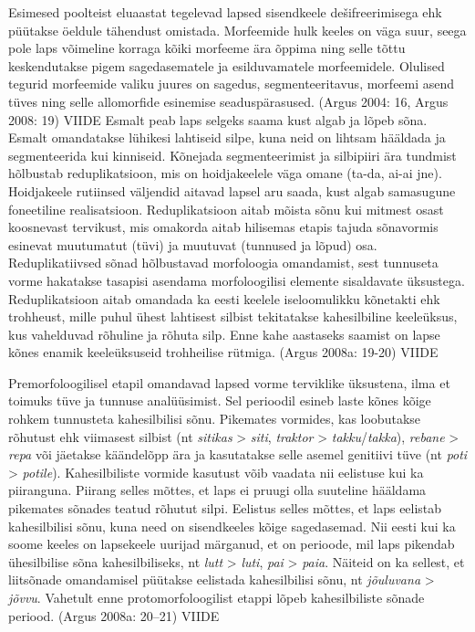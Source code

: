 \documentclass[12pt]{article}
\begin{document}
Esimesed poolteist eluaastat tegelevad lapsed sisendkeele dešifreerimisega ehk püütakse öeldule tähendust omistada. Morfeemide hulk keeles on väga suur, seega pole 
laps võimeline korraga kõiki morfeeme ära õppima ning selle tõttu keskendutakse pigem sagedasematele ja esilduvamatele morfeemidele. Olulised tegurid morfeemide valiku juures on sagedus, segmenteeritavus, morfeemi asend tüves ning selle allomorfide esinemise seaduspärasused. (Argus 2004: 16, Argus 2008: 19) VIIDE Esmalt peab laps selgeks saama kust algab ja lõpeb sõna. Esmalt omandatakse lühikesi lahtiseid silpe, kuna neid on lihtsam hääldada ja segmenteerida kui kinniseid. Kõnejada segmenteerimist ja silbipiiri ära tundmist hõlbustab reduplikatsioon, mis on hoidjakeelele väga omane (ta-da, ai-ai jne). Hoidjakeele rutiinsed väljendid aitavad lapsel aru saada, kust algab samasugune foneetiline realisatsioon. Reduplikatsioon aitab mõista sõnu kui mitmest osast koosnevast tervikust, mis omakorda aitab hilisemas etapis tajuda sõnavormis esinevat muutumatut (tüvi) ja muutuvat (tunnused ja lõpud) osa. Reduplikatiivsed sõnad hõlbustavad morfoloogia omandamist, sest tunnuseta vorme hakatakse tasapisi asendama morfoloogilisi elemente sisaldavate üksustega. Reduplikatsioon aitab omandada ka eesti keelele iseloomulikku kõnetakti ehk trohheust, mille puhul ühest lahtisest silbist tekitatakse kahesilbiline keeleüksus, kus vahelduvad rõhuline ja rõhuta silp. Enne kahe aastaseks saamist on lapse kõnes enamik keeleüksuseid trohheilise rütmiga. (Argus 2008a: 19-20) VIIDE

Premorfoloogilisel etapil omandavad lapsed vorme terviklike üksustena, ilma et toimuks tüve ja tunnuse analüüsimist. Sel perioodil esineb laste kõnes kõige rohkem tunnusteta kahesilbilisi sõnu. Pikemates vormides, kas loobutakse rõhutust ehk viimasest silbist (nt \emph{sitikas} > \emph{siti}, \emph{traktor} > \emph{takku}/\emph{takka}), \emph{rebane} > \emph{repa} või jäetakse käändelõpp ära ja kasutatakse selle asemel genitiivi tüve (nt \emph{poti} > \emph{potile}). Kahesilbiliste vormide kasutust võib vaadata nii eelistuse kui ka piiranguna. Piirang selles mõttes, et laps ei pruugi olla suuteline hääldama pikemates sõnades teatud rõhutut silpi. Eelistus selles mõttes, et laps eelistab kahesilbilisi sõnu, kuna need on sisendkeeles kõige sagedasemad. Nii eesti kui ka soome keeles on lapsekeele uurijad märganud, et on perioode, mil laps pikendab ühesilbilise sõna kahesilbiliseks, nt \emph{lutt} > \emph{luti}, \emph{pai} > \emph{paia}. Näiteid on ka sellest, et liitsõnade omandamisel püütakse eelistada kahesilbilisi sõnu, nt \emph{jõuluvana} > \emph{jõvvu}. Vahetult enne protomorfoloogilist etappi lõpeb kahesilbiliste sõnade periood. (Argus 2008a: 20–21) VIIDE
\end{document}
